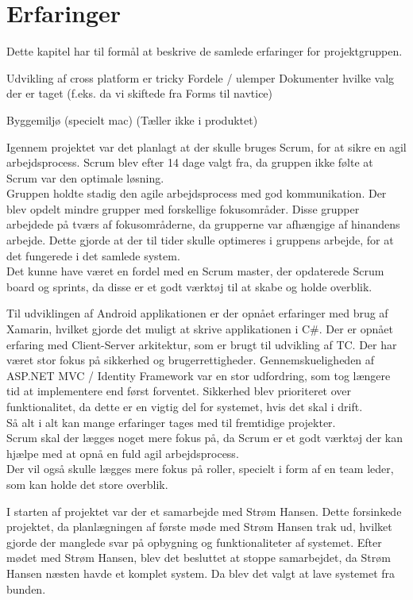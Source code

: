 \chapter{Erfaringer}
Dette kapitel har til formål at beskrive de samlede erfaringer for projektgruppen. 

Udvikling af cross platform er tricky
Fordele / ulemper
Dokumenter hvilke valg der er taget (f.eks. da vi skiftede fra Forms til navtice)

Byggemiljø (specielt mac) (Tæller ikke i produktet)

Igennem projektet var det planlagt at der skulle bruges Scrum, for at sikre en agil arbejdsprocess. Scrum blev efter 14 dage valgt fra, da gruppen ikke følte at Scrum var den optimale løsning.\\
Gruppen holdte stadig den agile arbejdsprocess med god kommunikation. Der blev opdelt mindre grupper med forskellige fokusområder. Disse grupper arbejdede på tværs af fokusområderne, da grupperne var afhængige af hinandens arbejde. Dette gjorde at der til tider skulle optimeres i gruppens arbejde, for at det fungerede i det samlede system.\\

Det kunne have været en fordel med en Scrum master, der opdaterede Scrum board og sprints, da disse er et godt værktøj til at skabe og holde overblik.

Til udviklingen af Android applikationen er der opnået erfaringer med brug af Xamarin, hvilket gjorde det muligt at skrive applikationen i C\#. 
\newline
Der er opnået erfaring med Client-Server arkitektur, som er brugt til udvikling af TC. 
\newline
Der har været stor fokus på sikkerhed og brugerrettigheder. Gennemskueligheden af ASP.NET MVC / Identity Framework var en stor udfordring, som tog længere tid at implementere end først forventet. Sikkerhed blev prioriteret over funktionalitet, da dette er en vigtig del for systemet, hvis det skal i drift.\\

Så alt i alt kan mange erfaringer tages med til fremtidige projekter.\\
Scrum skal der lægges noget mere fokus på, da Scrum er et godt værktøj der kan hjælpe med at opnå en fuld agil arbejdsprocess.\\
Der vil også skulle lægges mere fokus på roller, specielt i form af en team leder, som kan holde det store overblik.

I starten af projektet var der et samarbejde med Strøm Hansen. Dette forsinkede projektet, da planlægningen af første møde med Strøm Hansen trak ud, hvilket gjorde der manglede svar på opbygning og funktionaliteter af systemet. Efter mødet med Strøm Hansen, blev det besluttet at stoppe samarbejdet, da Strøm Hansen næsten havde et komplet system. Da blev det valgt at lave systemet fra bunden. 